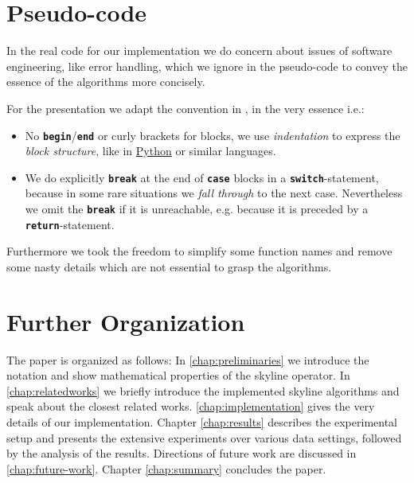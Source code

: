 \section{Pseudo-code}
In the real code for our implementation we do concern about issues of
software engineering, like error handling, which we ignore in the
pseudo-code to convey the essence of the algorithms more concisely.

For the presentation we adapt the convention in
\citep[Page~19]{Cormen2001}, in the very essence i.e.:

\begin{itemize}
\item 
No \texttt{\textbf{begin}}/\texttt{\textbf{end}} or curly brackets for
blocks, we use \emph{indentation} to express the \emph{block
structure}, like in \href{http://www.python.org/}{Python} or similar languages.

\item 
We do explicitly \texttt{\textbf{break}} at the end of
\texttt{\textbf{case}} blocks in a \texttt{\textbf{switch}}-statement,
because in some rare situations we \emph{fall through} to the next
case. Nevertheless we omit the \texttt{\textbf{break}} if it is
unreachable, e.g. because it is preceded by a
\texttt{\textbf{return}}-statement.
\end{itemize}

\noindent
Furthermore we took the freedom to simplify some function names and
remove some nasty details which are not essential to grasp the
algorithms.


\section{Further Organization}
The paper is organized as follows: In \autoref{chap:preliminaries} we
introduce the notation and show mathematical properties of the skyline
operator.  In \autoref{chap:relatedworks} we briefly introduce the
implemented skyline algorithms and speak about the closest related
works. \autoref{chap:implementation} gives the very details of our
implementation. Chapter \ref{chap:results} describes the experimental setup
and presents the extensive experiments over various data settings,
followed by the analysis of the results. Directions of future work are
discussed in \autoref{chap:future-work}. Chapter \ref{chap:summary}
concludes the paper.






